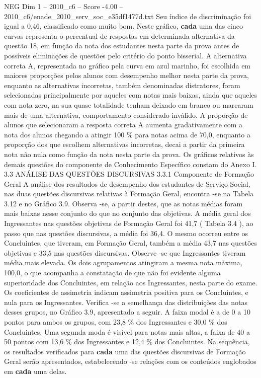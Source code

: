 \begin{textsample}{NEG Dim 1 – 2010\_c6 – Score -4.00 – 2010\_c6/enade\_2010\_serv\_soc\_e35df1477d.txt}
Seu índice de discriminação foi igual a 0,46, classificado como muito bom.
Neste gráfico, \textbf{cada} uma das cinco curvas representa o percentual de respostas em determinada alternativa da questão 18, em função da nota dos estudantes nesta parte da prova antes de possíveis eliminações de questões pelo critério do ponto bisserial.
A alternativa correta A, representada no gráfico pela curva em azul marinho, foi escolhida em maiores proporções pelos alunos com desempenho melhor nesta parte da prova, enquanto as alternativas incorretas, também denominadas distratores, foram selecionadas principalmente por aqueles com notas mais baixas, ainda que aqueles com nota zero, na sua quase totalidade tenham deixado em branco ou marcaram mais de uma alternativa, comportamento considerado inválido.
A proporção de alunos que selecionaram a resposta correta A aumenta gradativamente com a nota dos alunos chegando a atingir 100 \% para notas acima de 70,0, enquanto a proporção dos que escolhem alternativas incorretas, decai a partir da primeira nota não nula como função da nota nesta parte da prova.
Os gráficos relativos às demais questões do componente de Conhecimento Específico constam do Anexo I. 3.3 ANÁLISE DAS QUESTÕES DISCURSIVAS 3.3.1 Componente de Formação Geral A análise dos resultados de desempenho dos estudantes de Serviço Social, nas duas questões discursivas relativas à Formação Geral, encontra -se na Tabela 3.12 e no Gráfico 3.9.
Observa -se, a partir destes, que as notas médias foram mais baixas nesse conjunto do que no conjunto das objetivas.
A média geral dos Ingressantes nas questões objetivas de Formação Geral foi 41,7 ( Tabela 3.4 ), ao passo que nas questões discursivas, a média foi 36,4.
O mesmo ocorreu entre os Concluintes, que tiveram, em Formação Geral, também a média 43,7 nas questões objetivas e 33,5 nas questões discursivas.
Observe -se que Ingressantes tiveram média mais elevada.
Os dois agrupamentos atingiram a mesma nota máxima, 100,0, o que acompanha a constatação de que não foi evidente alguma superioridade dos Concluintes, em relação aos Ingressantes, nesta parte do exame.
Os coeficientes de assimetria indicam assimetria positiva para os Concluintes, e nula para os Ingressantes.
Verifica -se a semelhança das distribuições das notas desses grupos, no Gráfico 3.9, apresentado a seguir.
A faixa modal é a de 0 a 10 pontos para ambos os grupos, com 23,8 \% dos Ingressantes e 30,0 \% dos Concluintes.
Uma segunda moda é visível para notas mais altas, a faixa de 40 a 50 pontos com 13,6 \% dos Ingressantes e 12,4 \% dos Concluintes.
Na sequência, os resultados verificados para \textbf{cada} uma das questões discursivas de Formação Geral serão apresentados, estabelecendo -se relações com os conteúdos englobados em \textbf{cada} uma delas.

\end{textsample}
